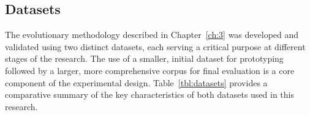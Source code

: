 \subsection{Datasets}
The evolutionary methodology described in Chapter~\ref{ch:3} was developed and validated using two distinct datasets, each serving a critical purpose at different stages of the research. The use of a smaller, initial dataset for prototyping followed by a larger, more comprehensive corpus for final evaluation is a core component of the experimental design. Table~\ref{tbl:datasets} provides a comparative summary of the key characteristics of both datasets used in this research.
\begin{table}[!tb]
    \captionsetup{skip=5pt}
    \centering
    \caption{Summary of Datasets Used in Evaluation}
    \label{tbl:datasets}
\end{table}
